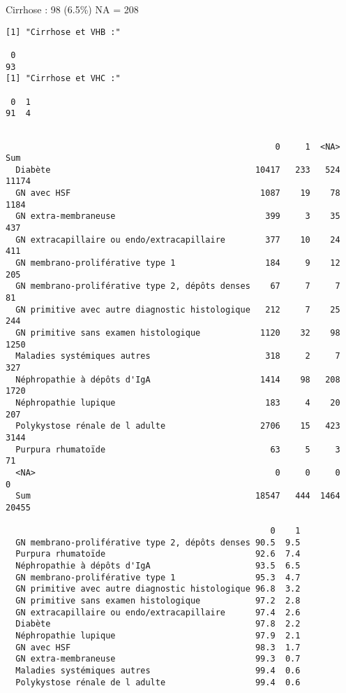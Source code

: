 \documentclass[11pt,a4paper]{article}\usepackage[]{graphicx}\usepackage[]{color}
\makeatletter
\newenvironment{kframe}{%
 \def\at@end@of@kframe{}%
 \ifinner\ifhmode%
  \def\at@end@of@kframe{\end{minipage}}%
  \begin{minipage}{\columnwidth}%
 \fi\fi%
 \def\FrameCommand##1{\hskip\@totalleftmargin \hskip-\fboxsep
 \colorbox{shadecolor}{##1}\hskip-\fboxsep
     \hskip-\linewidth \hskip-\@totalleftmargin \hskip\columnwidth}%
 \MakeFramed {\advance\hsize-\width
   \@totalleftmargin\z@ \linewidth\hsize
   \@setminipage}}%
 {\par\unskip\endMakeFramed%
 \at@end@of@kframe}
\newenvironment{knitrout}{}{} %
\makeatother
\begin{document}
Cirrhose : 98 (6.5\%) NA = 208

\begin{knitrout}
\color{fgcolor}\begin{kframe}
\begin{verbatim}
[1] "Cirrhose et VHB :"

 0 
93 
[1] "Cirrhose et VHC :"

 0  1 
91  4 
\end{verbatim}
\end{kframe}
\end{knitrout}


\begin{knitrout}
\color{fgcolor}\begin{kframe}
\begin{verbatim}
                                                 
                                                      0     1  <NA>   Sum
  Diabète                                         10417   233   524 11174
  GN avec HSF                                      1087    19    78  1184
  GN extra-membraneuse                              399     3    35   437
  GN extracapillaire ou endo/extracapillaire        377    10    24   411
  GN membrano-proliférative type 1                  184     9    12   205
  GN membrano-proliférative type 2, dépôts denses    67     7     7    81
  GN primitive avec autre diagnostic histologique   212     7    25   244
  GN primitive sans examen histologique            1120    32    98  1250
  Maladies systémiques autres                       318     2     7   327
  Néphropathie à dépôts d'IgA                      1414    98   208  1720
  Néphropathie lupique                              183     4    20   207
  Polykystose rénale de l adulte                   2706    15   423  3144
  Purpura rhumatoïde                                 63     5     3    71
  <NA>                                                0     0     0     0
  Sum                                             18547   444  1464 20455
                                                 
                                                     0    1
  GN membrano-proliférative type 2, dépôts denses 90.5  9.5
  Purpura rhumatoïde                              92.6  7.4
  Néphropathie à dépôts d'IgA                     93.5  6.5
  GN membrano-proliférative type 1                95.3  4.7
  GN primitive avec autre diagnostic histologique 96.8  3.2
  GN primitive sans examen histologique           97.2  2.8
  GN extracapillaire ou endo/extracapillaire      97.4  2.6
  Diabète                                         97.8  2.2
  Néphropathie lupique                            97.9  2.1
  GN avec HSF                                     98.3  1.7
  GN extra-membraneuse                            99.3  0.7
  Maladies systémiques autres                     99.4  0.6
  Polykystose rénale de l adulte                  99.4  0.6
\end{verbatim}
\end{kframe}
\end{knitrout}
\end{document}

